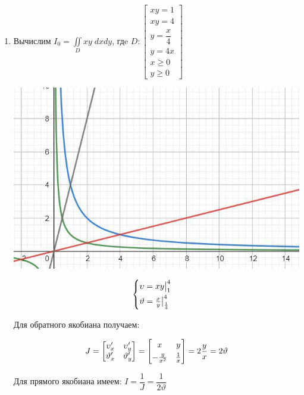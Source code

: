 \documentclass[../../main.tex]{subfiles}
\begin{document}
	\begin{examples}
~

		\begin{enumerate}
			\item
			Вычислим $\displaystyle I_0 = \iint\limits_D xy\; dxdy$, гдe
			$D: \left[
			\begin{array}{l} 
			xy= 1\\
			xy = 4\\
			y = \dfrac{x}{4}\\
			y = 4x\\
			x \geq 0\\
			y \geq 0
			\end{array}
			\right]
			$
			
			\includegraphics[scale=0.85]{lec15_2}
			
			\[\begin{cases}
			\smallskip
			\upsilon = xy \big|_{1}^{4}\\
			\vartheta = \frac{x}{y} \big|_{\frac{1}{4}}^{4}
			\end{cases}\]
			
			
			Для обратного якобиана получаем: 
			
			\[J = \begin{bmatrix}
			\upsilon'_x & \upsilon'_y\\
			\vartheta'_x & 	\vartheta'_y
			\end{bmatrix} = \begin{bmatrix}
			\smallskip
			x & y\\
			-\frac{y}{x^2}& \frac{1}{x}
			\end{bmatrix} = 2 \dfrac{y}{x} = 2 \vartheta\]
			
			Для прямого якобиана имеем: $I = \dfrac{1}{J} = \dfrac{1}{2\vartheta}$
			

\end{enumerate}
\end{examples}
\end{document}
